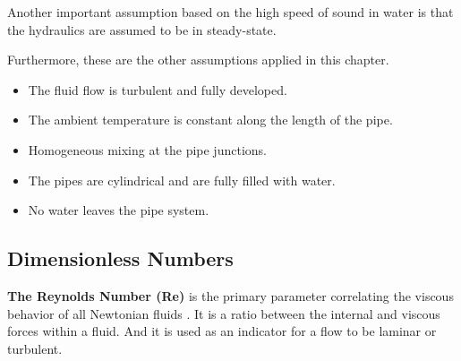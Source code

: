 Another important assumption based on the high speed of sound in water is that the hydraulics are assumed to be in steady-state. 

Furthermore, these are the other assumptions applied in this chapter. 
\begin{itemize}
    \item The fluid flow is turbulent and fully developed.
    \item The ambient temperature is constant along the length of the pipe.
    \item Homogeneous mixing at the pipe junctions.
    \item The pipes are cylindrical and are fully filled with water.
    \item No water leaves the pipe system.
\end{itemize}


\subsection{Dimensionless Numbers}
\textbf{The Reynolds Number (Re)} is the primary parameter correlating the viscous behavior of all Newtonian fluids \cite{white2011fluid}. It is a ratio between the internal and viscous forces within a fluid. And it is used as an indicator for a flow to be laminar or turbulent. 

